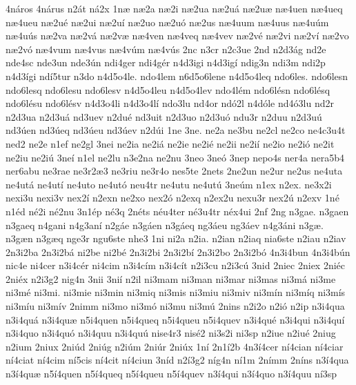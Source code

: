 {4n^^e1ros
4n^^e1rus
n2^^e1t
n^^e12x
1n^^e6
n^^e62a
n^^e62i
n^^e62ua
n^^e62u^^e1
n^^e62u^^e6
n^^e64uen
n^^e64ueq
n^^e64ueu
n^^e62u^^e9
n^^e62ui
n^^e62u^^ed
n^^e62uo
n^^e62u^^f3
n^^e62us
n^^e64uum
n^^e64uus
n^^e64u^^fam
n^^e64u^^fas
n^^e62va
n^^e62v^^e1
n^^e62v^^e6
n^^e64ven
n^^e64veq
n^^e64vev
n^^e62v^^e9
n^^e62vi
n^^e62v^^ed
n^^e62vo
n^^e62v^^f3
n^^e64vum
n^^e64vus
n^^e64v^^fam
n^^e64v^^fas
2nc
n3cr
n2c3ue
2nd
n2d3^^e1g
nd2e
nde4sc
nde3un
nde3^^fan
ndi4ger
ndi4g^^e9r
n4d3igi
n4d3ig^^ed
ndig3n
ndi3m
ndi2p
n4d3^^edgi
nd^^ed5tur
n3do
n4d5o4le.
ndo4lem
n6d5o6lene
n4d5o4leq
ndo6les.
ndo6lesn
ndo6lesq
ndo6lesu
ndo6lesv
n4d5o4leu
n4d5o4lev
ndo4l^^e9m
ndo6l^^e9sn
ndo6l^^e9sq
ndo6l^^e9su
ndo6l^^e9sv
n4d3o4li
n4d3o4l^^ed
ndo3lu
nd4or
nd^^f32l
n4d^^f3le
nd4^^f33lu
nd2r
n2d3ua
n2d3u^^e1
nd3uev
n2du^^e9
nd3uit
n2d3uo
n2d3u^^f3
ndu3r
n2duu
n2d3u^^fa
nd3^^faen
nd3^^faeq
nd3^^faeu
nd3^^faev
n2d^^fai
1ne
3ne.
ne2a
ne3bu
ne2cl
ne2co
ne4c3u4t
ned2
ne2e
n1ef
ne2gl
3nei
ne2ia
ne2i^^e1
ne2ie
ne2i^^e9
ne2ii
ne2i^^ed
ne2io
ne2i^^f3
ne2it
ne2iu
ne2i^^fa
3ne^^ed
n1el
ne2lu
n3e2na
ne2nu
3neo
3ne^^f3
3nep
nepo4s
ner4a
nera5b4
ner6abu
ne3rae
ne3r2^^e63
ne3riu
ne3r4o
nes5te
2nets
2ne2un
ne2ur
ne2us
ne4uta
ne4ut^^e1
ne4ut^^ed
ne4uto
ne4ut^^f3
neu4tr
ne4utu
ne4ut^^fa
3ne^^fam
n1ex
n2ex.
ne3x2i
nexi3u
nexi3v
nex2^^ed
n2exn
ne2xo
nex2^^f3
n2exq
n2ex2u
nexu3r
nex2^^fa
n2exv
1n^^e9
n1^^e9d
n^^e92i
n^^e92nu
3n1^^e9p
n^^e93q
2n^^e9ts
n^^e9u4ter
n^^e93u4tr
n^^e9x4ui
2nf
2ng
n3gae.
n3gaen
n3gaeq
n4gani
n4g3an^^ed
n2g^^e1e
n3g^^e1en
n3g^^e1eq
ng3^^e1eu
ng3^^e1ev
n4g3^^e1ni
n3g^^e6.
n3g^^e6n
n3g^^e6q
nge3r
ngu6ste
nhe3
1ni
ni2a
n2ia.
n2ian
n2iaq
nia6ste
n2iau
n2iav
2n3i2ba
2n3i2b^^e1
ni2be
ni2b^^e9
2n3i2bi
2n3i2b^^ed
2n3i2bo
2n3i2b^^f3
4n3i4bun
4n3i4b^^fan
nic4e
ni4cer
n3i4c^^e9r
ni4cim
n3i4c^^edm
n3i4c^^edt
n2i3cu
n2i3c^^fa
3nid
2niec
2niex
2ni^^e9c
2ni^^e9x
n2i3g2
nig4n
3nii
3ni^^ed
n2il
ni3mam
ni3man
ni3mar
ni3mas
ni3m^^e1
ni3me
ni3m^^e9
ni3mi.
ni3mie
ni3min
ni3miq
ni3mis
ni3miu
ni3miv
ni3m^^edn
ni3m^^edq
ni3m^^eds
ni3m^^edu
ni3m^^edv
2nimm
ni3mo
ni3m^^f3
ni3mu
ni3m^^fa
2nins
n2i2o
n2i^^f3
n2ip
n3i4qua
n3i4qu^^e1
n3i4qu^^e6
n5i4quen
n5i4queq
n5i4queu
n5i4quev
n3i4qu^^e9
n3i4qui
n3i4qu^^ed
n3i4quo
n3i4qu^^f3
n3i4quu
n3i4qu^^fa
nise4r3
nis^^e92
ni3s2i
ni3sp
n2iue
n2iu^^e9
2niug
n2ium
2niux
2ni^^fad
2ni^^fag
n2i^^fam
2ni^^far
2ni^^fax
1n^^ed
2n1^^ed2b
4n3^^ed4cer
n^^ed4cian
n^^ed4ciar
n^^ed4ciat
n^^ed4cim
n^^ed5cis
n^^ed4cit
n^^ed4ciun
3n^^edd
n2^^ed3g2
n^^edg4n
n^^ed1m
2n^^edmm
2n^^edns
n3^^ed4qua
n3^^ed4qu^^e6
n5^^ed4quen
n5^^ed4queq
n5^^ed4queu
n5^^ed4quev
n3^^ed4qui
n3^^ed4quo
n3^^ed4quu
n^^ed3sp
}
